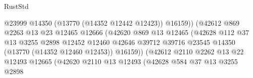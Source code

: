 \begin{lexlean}{RustStd}
\begin{coremodule}
                                                @23999
                                                @14350
                                                (@13770 (@14352 @12442 @12423))
                                                @16159))
                                            (@42612
                                              @869
                                              @2263
                                              @13
                                              @23
                                              @12465
                                              @12666
                                              (@42620
                                                @869
                                                @13
                                                @12465
                                                (@42628
                                                  @112
                                                  @37
                                                  @13
                                                  @3255
                                                  @2898
                                                  @12452
                                                  @12460
                                                  @42646
                                                  @39712
                                                  @39716
                                                  @23545
                                                  @14350
                                                  (@13770 (@14352 @12460 @12453))
                                                  @16159))
                                              (@42612
                                                @2110
                                                @2262
                                                @13
                                                @22
                                                @12493
                                                @12665
                                                (@42620
                                                  @2110
                                                  @13
                                                  @12493
                                                  (@42628
                                                    @584
                                                    @37
                                                    @13
                                                    @3255
                                                    @2898

\end{coremodule}
\end{lexlean}
